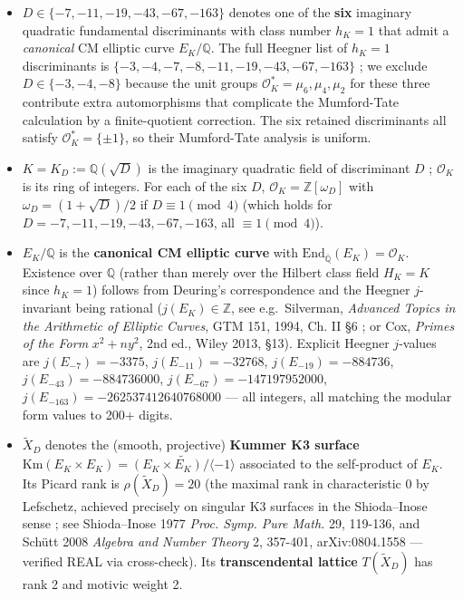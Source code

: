 \documentclass[
  11pt,
  a4paper,
]{article}
\providecommand{\tightlist}{\setlength{\itemsep}{0pt}\setlength{\parskip}{0pt}}
\providecommand{\tightlist}{%
  \setlength{\itemsep}{0pt}\setlength{\parskip}{0pt}}
\begin{document}
\begin{itemize}
\tightlist
\item
  \(D \in \{-7, -11, -19, -43, -67, -163\}\) denotes one of the \textbf{six} imaginary quadratic fundamental discriminants with class number \(h_K = 1\) that admit a \emph{canonical} CM elliptic curve \(E_K / \mathbb{Q}\). The full Heegner list of \(h_K = 1\) discriminants is \(\{-3, -4, -7, -8, -11, -19, -43, -67, -163\}\) ; we exclude \(D \in \{-3, -4, -8\}\) because the unit groups \(\mathcal{O}_K^* = \mu_6, \mu_4, \mu_2\) for these three contribute extra automorphisms that complicate the Mumford-Tate calculation by a finite-quotient correction. The six retained discriminants all satisfy \(\mathcal{O}_K^* = \{\pm 1\}\), so their Mumford-Tate analysis is uniform.
\item
  \(K = K_D := \mathbb{Q}(\sqrt{D})\) is the imaginary quadratic field of discriminant \(D\) ; \(\mathcal{O}_K\) is its ring of integers. For each of the six \(D\), \(\mathcal{O}_K = \mathbb{Z}[\omega_D]\) with \(\omega_D = (1 + \sqrt{D})/2\) if \(D \equiv 1 \pmod 4\) (which holds for \(D = -7, -11, -19, -43, -67, -163\), all \(\equiv 1 \pmod 4\)).
\item
  \(E_K / \mathbb{Q}\) is the \textbf{canonical CM elliptic curve} with \(\mathrm{End}_{\overline{\mathbb{Q}}}(E_K) = \mathcal{O}_K\). Existence over \(\mathbb{Q}\) (rather than merely over the Hilbert class field \(H_K = K\) since \(h_K = 1\)) follows from Deuring's correspondence and the Heegner \(j\)-invariant being rational (\(j(E_K) \in \mathbb{Z}\), see e.g.~Silverman, \emph{Advanced Topics in the Arithmetic of Elliptic Curves}, GTM 151, 1994, Ch. II §6 ; or Cox, \emph{Primes of the Form} \(x^2 + ny^2\), 2nd ed., Wiley 2013, §13). Explicit Heegner \(j\)-values are \(j(E_{-7}) = -3375\), \(j(E_{-11}) = -32768\), \(j(E_{-19}) = -884736\), \(j(E_{-43}) = -884736000\), \(j(E_{-67}) = -147197952000\), \(j(E_{-163}) = -262537412640768000\) --- all integers, all matching the modular form values to 200+ digits.
\item
  \(\widetilde{X}_D\) denotes the (smooth, projective) \textbf{Kummer K3 surface} \(\mathrm{Km}(E_K \times E_K) = \widetilde{(E_K \times E_K) / \langle -1 \rangle}\) associated to the self-product of \(E_K\). Its Picard rank is \(\rho(\widetilde{X}_D) = 20\) (the maximal rank in characteristic 0 by Lefschetz, achieved precisely on singular K3 surfaces in the Shioda--Inose sense ; see Shioda--Inose 1977 \emph{Proc. Symp. Pure Math.} 29, 119-136, and Schütt 2008 \emph{Algebra and Number Theory} 2, 357-401, arXiv:0804.1558 --- verified REAL via cross-check). Its \textbf{transcendental lattice} \(T(\widetilde{X}_D)\) has rank 2 and motivic weight 2.

\end{itemize}
\end{document}
